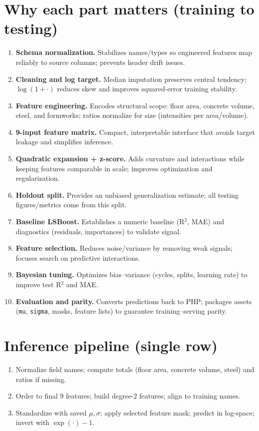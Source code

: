 \documentclass[11pt]{article}
\begin{document}
\section*{Why each part matters (training to testing)}
\begin{enumerate}[label=Part~\arabic*:, leftmargin=*]
  \item \textbf{Schema normalization.} Stabilizes names/types so engineered features map reliably to source columns; prevents header drift issues.
  \item \textbf{Cleaning and log target.} Median imputation preserves central tendency; $\log(1+\cdot)$ reduces skew and improves squared-error training stability.
  \item \textbf{Feature engineering.} Encodes structural scope: floor area, concrete volume, steel, and formworks; ratios normalize for size (intensities per area/volume).
  \item \textbf{9-input feature matrix.} Compact, interpretable interface that avoids target leakage and simplifies inference.
  \item \textbf{Quadratic expansion + z-score.} Adds curvature and interactions while keeping features comparable in scale; improves optimization and regularization.
  \item \textbf{Holdout split.} Provides an unbiased generalization estimate; all testing figures/metrics come from this split.
  \item \textbf{Baseline LSBoost.} Establishes a numeric baseline (R$^2$, MAE) and diagnostics (residuals, importances) to validate signal.
  \item \textbf{Feature selection.} Reduces noise/variance by removing weak signals; focuses search on predictive interactions.
  \item \textbf{Bayesian tuning.} Optimizes bias–variance (cycles, splits, learning rate) to improve test R$^2$ and MAE.
  \item \textbf{Evaluation and parity.} Converts predictions back to PHP; packages assets (\verb|mu|, \verb|sigma|, masks, feature lists) to guarantee training–serving parity.
\end{enumerate}

\section*{Inference pipeline (single row)}
\begin{enumerate}
  \item Normalize field names; compute totals (floor area, concrete volume, steel) and ratios if missing.
  \item Order to final 9 features; build degree-2 features; align to training names.
  \item Standardize with saved $\mu,\sigma$; apply selected feature mask; predict in log-space; invert with $\exp(\cdot)-1$.
\end{enumerate}
\end{document}
